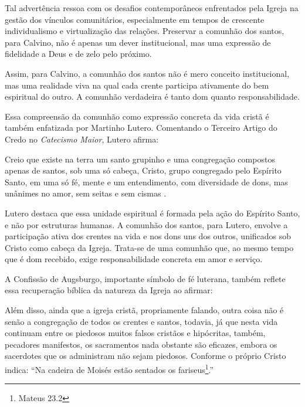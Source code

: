 Tal advertência ressoa com os desafios contemporâneos enfrentados pela Igreja na gestão dos vínculos comunitários, especialmente em tempos de crescente individualismo e virtualização das relações. Preservar a comunhão dos santos, para Calvino, não é apenas um dever institucional, mas uma expressão de fidelidade a Deus e de zelo pelo próximo.

Assim, para Calvino, a comunhão dos santos não é mero conceito institucional, mas uma realidade viva na qual cada crente participa ativamente do bem espiritual do outro. A comunhão verdadeira é tanto dom quanto responsabilidade.

Essa compreensão da comunhão como expressão concreta da vida cristã é também enfatizada por Martinho Lutero. Comentando o Terceiro Artigo do Credo no \textit{Catecismo Maior}, Lutero afirma:
\begin{citacao}
Creio que existe na terra um santo grupinho e uma congregação compostos apenas de santos, sob uma só cabeça, Cristo, grupo congregado pelo Espírito Santo, em uma só fé, mente e um entendimento, com diversidade de dons, mas unânimes no amor, sem seitas e sem cismas \cite[p.~454]{livroConcordia}.
\end{citacao}

Lutero destaca que essa unidade espiritual é formada pela ação do Espírito Santo, e não por estruturas humanas. A comunhão dos santos, para Lutero, envolve a participação ativa dos crentes na vida e nos dons uns dos outros, unificados sob Cristo como cabeça da Igreja. Trata-se de uma comunhão que, ao mesmo tempo que é dom recebido, exige responsabilidade concreta em amor e serviço.

A Confissão de Augsburgo, importante símbolo de fé luterana, também reflete essa recuperação bíblica da natureza da Igreja ao afirmar:
\begin{citacao}
Além disso, ainda que a igreja cristã, propriamente falando, outra coisa não é senão a congregação de todos os crentes e santos, todavia, já que nesta vida continuam entre os piedosos muitos falsos cristãos e hipócritas, também, pecadores manifestos, os sacramentos nada obstante são eficazes, embora os sacerdotes que os administram não sejam piedosos. Conforme o próprio Cristo indica: ``Na cadeira de Moisés estão sentados os fariseus\footnote{Mateus 23.2}.''\cite[Artigo~VII, p.~32]{livroConcordia}
\end{citacao}


